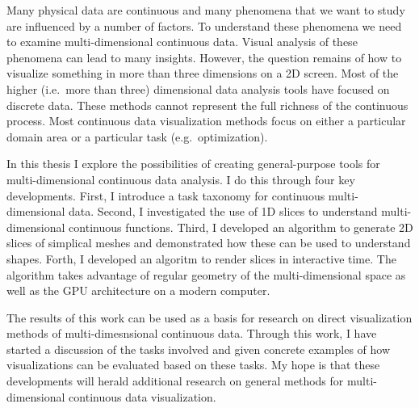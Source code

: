 

Many physical data are continuous and many phenomena that we want to study are
influenced by a number of factors. To understand these phenomena we need to
examine multi-dimensional continuous data.  Visual analysis of these phenomena
can lead to many insights. However, the question remains of how to visualize
something in more than three dimensions on a 2D screen.  Most of the higher
(i.e.\ more than three) dimensional data analysis tools have focused on
discrete data.  These methods cannot represent the full richness of the
continuous process.  Most continuous data visualization methods focus on either
a particular domain area or a particular task (e.g.\ optimization).

In this thesis I explore the possibilities of creating general-purpose tools
for multi-dimensional continuous data analysis. I do this through four key
developments. First, I introduce a task taxonomy for continuous
multi-dimensional data.  Second, I investigated the use of 1D slices to
understand multi-dimensional continuous functions.  Third, I developed an
algorithm to generate 2D slices of simplical meshes and demonstrated how these
can be used to understand shapes.  Forth, I developed an algoritm to render
slices in interactive time. The algorithm takes advantage of regular geometry
of the multi-dimensional space as well as the GPU architecture on a modern
computer.

The results of this work can be used as a basis for research on direct
visualization methods of multi-dimesnsional continuous data. Through this work,
I have started a discussion of the tasks involved and given concrete examples
of how visualizations can be evaluated based on these tasks.  My hope is that
these developments will herald additional research on general methods for 
multi-dimensional continuous data visualization.

